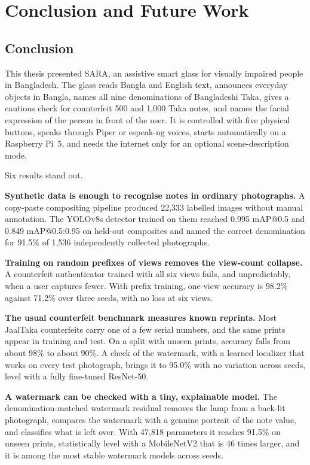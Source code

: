 \clearpage
\chapter{Conclusion and Future Work}
\label{chap:conclusion}

\section{Conclusion}
This thesis presented SARA, an assistive smart glass for visually impaired people in Bangladesh. The glass reads Bangla and English text, announces everyday objects in Bangla, names all nine denominations of Bangladeshi Taka, gives a cautious check for counterfeit 500 and 1,000 Taka notes, and names the facial expression of the person in front of the user. It is controlled with five physical buttons, speaks through Piper or espeak-ng voices, starts automatically on a Raspberry Pi~5, and needs the internet only for an optional scene-description mode.

Six results stand out.

\textbf{Synthetic data is enough to recognise notes in ordinary photographs.} A copy-paste compositing pipeline produced 22,333 labelled images without manual annotation. The YOLOv8s detector trained on them reached 0.995 mAP@0.5 and 0.849 mAP@0.5:0.95 on held-out composites and named the correct denomination for 91.5\% of 1,536 independently collected photographs.

\textbf{Training on random prefixes of views removes the view-count collapse.} A counterfeit authenticator trained with all six views fails, and unpredictably, when a user captures fewer. With prefix training, one-view accuracy is 98.2\% against 71.2\% over three seeds, with no loss at six views.

\textbf{The usual counterfeit benchmark measures known reprints.} Most JaalTaka counterfeits carry one of a few serial numbers, and the same prints appear in training and test. On a split with unseen prints, accuracy falls from about 98\% to about 90\%. A check of the watermark, with a learned localizer that works on every test photograph, brings it to 95.0\% with no variation across seeds, level with a fully fine-tuned ResNet-50.

\textbf{A watermark can be checked with a tiny, explainable model.} The denomination-matched watermark residual removes the lamp from a back-lit photograph, compares the watermark with a genuine portrait of the note value, and classifies what is left over. With 47,818 parameters it reaches 91.5\% on unseen prints, statistically level with a MobileNetV2 that is 46 times larger, and it is among the most stable watermark models across seeds.

